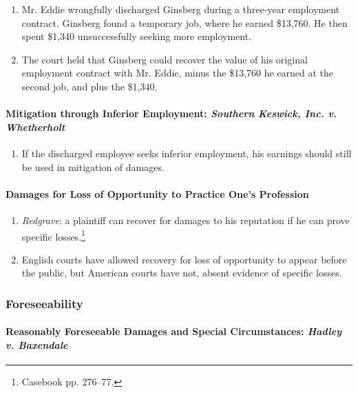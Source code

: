 \begin{enumerate}
    \item Mr. Eddie wrongfully discharged Ginsberg during a three-year 
    employment contract. Ginsberg found a temporary job, where he earned 
    \$13,760. He then spent \$1,340 unsuccessfully seeking more employment.
    \item The court held that Ginsberg could recover the value of his original 
    employment contract with Mr. Eddie, minus the \$13,760 he earned at the 
    second job, and plus the \$1,340.
\end{enumerate}

\paragraph{Mitigation through Inferior Employment: \emph{Southern Keswick, 
Inc. v. Whetherholt}}

\begin{enumerate}
    \item If the discharged employee seeks inferior employment, his earnings 
    should still be used in mitigation of damages.
\end{enumerate}

\paragraph{Damages for Loss of Opportunity to Practice One's Profession}

\begin{enumerate}
    \item \emph{Redgrave}: a plaintiff can recover for damages to his 
    reputation if he can prove specific losses.\footnote{Casebook pp. 276--77.}
    \item English courts have allowed recovery for loss of opportunity to 
    appear before the public, but American courts have not, absent evidence of 
    specific losses.
\end{enumerate}

\subsubsection{Foreseeability}

\paragraph{Reasonably Foreseeable Damages and Special Circumstances: 
\emph{Hadley v. Baxendale}}

